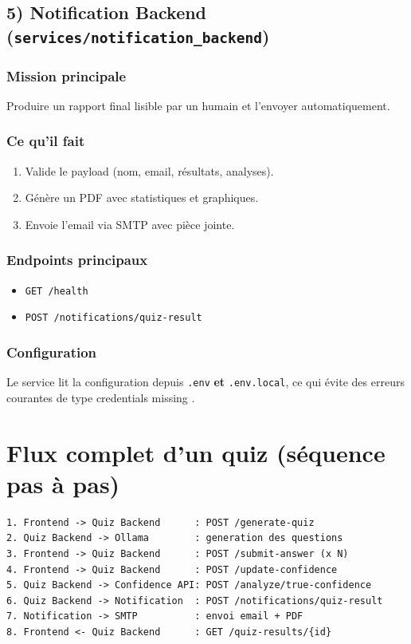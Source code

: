 \documentclass[12pt,a4paper]{article}
\begin{document}
\subsection{5) Notification Backend (\texttt{services/notification\_backend})}
\subsubsection{Mission principale}
Produire un rapport final lisible par un humain et l'envoyer automatiquement.

\subsubsection{Ce qu'il fait}
\begin{enumerate}
    \item Valide le payload (nom, email, r\'esultats, analyses).
    \item G\'en\`ere un PDF avec statistiques et graphiques.
    \item Envoie l'email via SMTP avec pi\`ece jointe.
\end{enumerate}

\subsubsection{Endpoints principaux}
\begin{itemize}
    \item \texttt{GET /health}
    \item \texttt{POST /notifications/quiz-result}
\end{itemize}

\subsubsection{Configuration}
Le service lit la configuration depuis \texttt{.env} \textbf{et} \texttt{.env.local}, ce qui \'evite des erreurs courantes de type \og credentials missing \fg{}.

\section{Flux complet d'un quiz (s\'equence pas \`a pas)}
\begin{lstlisting}[basicstyle=\ttfamily\small]
1. Frontend -> Quiz Backend      : POST /generate-quiz
2. Quiz Backend -> Ollama        : generation des questions
3. Frontend -> Quiz Backend      : POST /submit-answer (x N)
4. Frontend -> Quiz Backend      : POST /update-confidence
5. Quiz Backend -> Confidence API: POST /analyze/true-confidence
6. Quiz Backend -> Notification  : POST /notifications/quiz-result
7. Notification -> SMTP          : envoi email + PDF
8. Frontend <- Quiz Backend      : GET /quiz-results/{id}
\end{lstlisting}
\end{document}
